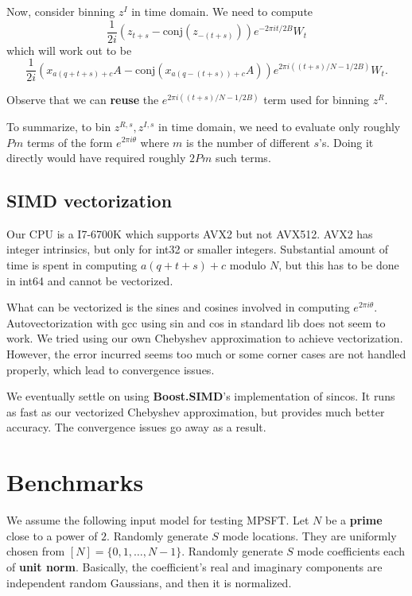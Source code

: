 \documentclass[10pt]{article}
\begin{document}
Now, consider binning $z^I$ in time domain. We need to compute
$$\frac{1}{2i} ( z_{t+s} - \text{conj}(z_{-(t+s)})) e^{-2\pi i t/2B} W_t$$
which will work out to be
$$\frac{1}{2i} \left( x_{a(q+t+s)+c} A - \text{conj}(x_{a(q-(t+s))+c} A)\right)e^{2\pi i ((t+s)/N - 1/2B)} W_t.$$

Observe that we can \textbf{reuse} the $e^{2\pi i ((t+s)/N - 1/2B)}$ term used for binning $z^R$.

To summarize, to bin $z^{R,s}, z^{I,s}$ in time domain, we need to evaluate only roughly $P m$ terms of the form $e^{2\pi i \theta}$ where $m$ is the number of different $s$'s. Doing it directly would have required roughly $2P m$ such terms.

\subsection{SIMD vectorization}

Our CPU is a I7-6700K which supports AVX2 but not AVX512. AVX2 has integer intrinsics, but only for int32 or smaller integers. Substantial amount of time is spent in computing $a(q+t+s)+c$ modulo $N$, but this has to be done in int64 and cannot be vectorized.

What can be vectorized is the sines and cosines involved in computing $e^{2\pi i \theta}$. Autovectorization with gcc using sin and cos in standard lib does not seem to work. We tried using our own Chebyshev approximation to achieve vectorization. However, the error incurred seems too much or some corner cases are not handled properly, which lead to convergence issues.

We eventually settle on using \textbf{Boost.SIMD}'s \cite{Esterie:2014:BGP:2568058.2568063} implementation of sincos. It runs as fast as our vectorized Chebyshev approximation, but provides much better accuracy. The convergence issues go away as a result.

\section{Benchmarks}

We assume the following input model for testing MPSFT. Let $N$ be a \textbf{prime} close to a power of $2$. Randomly generate $S$ mode locations. They are uniformly chosen from $[N]=\{0,1,\ldots,N-1\}$. Randomly generate $S$ mode coefficients each of \textbf{unit norm}. Basically, the coefficient's real and imaginary components are independent random Gaussians, and then it is normalized.
\end{document}
